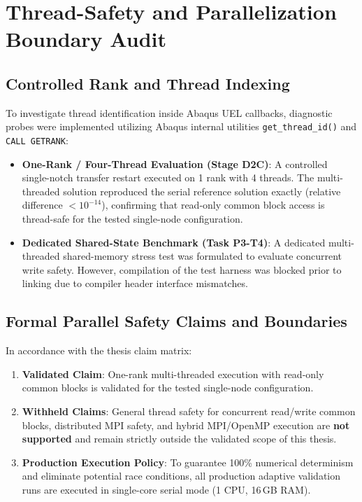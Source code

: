 \section{Thread-Safety and Parallelization Boundary Audit}
\label{sec:hpc_parallel_audit}

\subsection{Controlled Rank and Thread Indexing}
To investigate thread identification inside Abaqus UEL callbacks, diagnostic probes were implemented utilizing Abaqus internal utilities \texttt{get\_thread\_id()} and \texttt{CALL GETRANK}:
\begin{itemize}
    \item \textbf{One-Rank / Four-Thread Evaluation (Stage D2C)}: A controlled single-notch transfer restart executed on 1 rank with 4 threads. The multi-threaded solution reproduced the serial reference solution exactly (relative difference $< 10^{-14}$), confirming that read-only common block access is thread-safe for the tested single-node configuration.
    \item \textbf{Dedicated Shared-State Benchmark (Task P3-T4)}: A dedicated multi-threaded shared-memory stress test was formulated to evaluate concurrent write safety. However, compilation of the test harness was blocked prior to linking due to compiler header interface mismatches.
\end{itemize}

\subsection{Formal Parallel Safety Claims and Boundaries}
In accordance with the thesis claim matrix:
\begin{enumerate}
    \item \textbf{Validated Claim}: One-rank multi-threaded execution with read-only common blocks is validated for the tested single-node configuration.
    \item \textbf{Withheld Claims}: General thread safety for concurrent read/write common blocks, distributed MPI safety, and hybrid MPI/OpenMP execution are \textbf{not supported} and remain strictly outside the validated scope of this thesis.
    \item \textbf{Production Execution Policy}: To guarantee 100\% numerical determinism and eliminate potential race conditions, all production adaptive validation runs are executed in single-core serial mode (1 CPU, 16\,GB RAM).
\end{enumerate}

